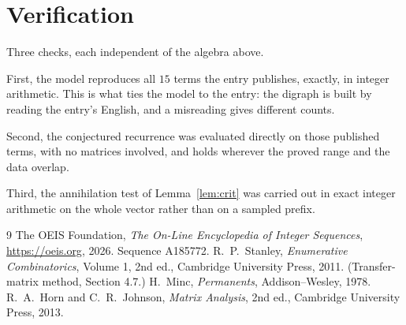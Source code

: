 \documentclass[11pt,a4paper]{article}
\theoremstyle{plain}
\theoremstyle{definition}
\begin{document}
\section{Verification}

Three checks, each independent of the algebra above.

First, the model reproduces all $15$ terms the entry publishes, exactly, in integer
arithmetic. This is what ties the model to the entry: the digraph is built by reading the
entry's English, and a misreading gives different counts.

Second, the conjectured recurrence was evaluated directly on those published terms, with no
matrices involved, and holds wherever the proved range and the data overlap.

Third, the annihilation test of Lemma~\ref{lem:crit} was carried out in exact integer
arithmetic on the whole vector rather than on a sampled prefix.

\begin{thebibliography}{9}
 The OEIS Foundation, \emph{The On-Line Encyclopedia of Integer
Sequences}, \url{https://oeis.org}, 2026. Sequence A185772.
 R.~P.~Stanley, \emph{Enumerative Combinatorics}, Volume 1, 2nd ed.,
Cambridge University Press, 2011. (Transfer-matrix method, Section 4.7.)
 H.~Minc, \emph{Permanents}, Addison--Wesley, 1978.
 R.~A.~Horn and C.~R.~Johnson, \emph{Matrix Analysis}, 2nd ed., Cambridge
University Press, 2013.
\end{thebibliography}
\end{document}

